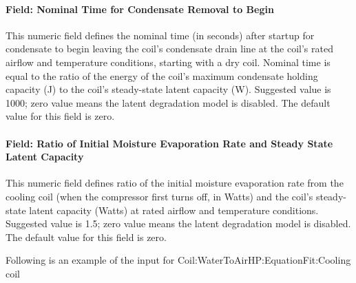 \paragraph{Field: Nominal Time for Condensate Removal to Begin}\label{field-nominal-time-for-condensate-removal-to-begin-4}

This numeric field defines the nominal time (in seconds) after startup for condensate to begin leaving the coil's condensate drain line at the coil's rated airflow and temperature conditions, starting with a dry coil. Nominal time is equal to the ratio of the energy of the coil's maximum condensate holding capacity (J) to the coil's steady-state latent capacity (W). Suggested value is 1000; zero value means the latent degradation model is disabled. The default value for this field is zero.

\paragraph{Field: Ratio of Initial Moisture Evaporation Rate and Steady State Latent Capacity}\label{field-ratio-of-initial-moisture-evaporation-rate-and-steady-state-latent-capacity-4}

This numeric field defines ratio of the initial moisture evaporation rate from the cooling coil (when the compressor first turns off, in Watts) and the coil's steady-state latent capacity (Watts) at rated airflow and temperature conditions. Suggested value is 1.5; zero value means the latent degradation model is disabled. The default value for this field is zero.

Following is an example of the input for Coil:WaterToAirHP:EquationFit:Cooling coil

